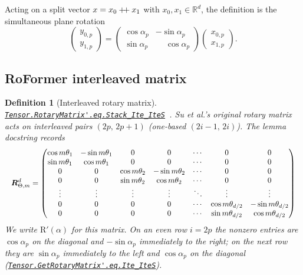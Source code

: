 \documentclass[11pt,a4paper]{article}
\newcommand{\lmod}[1]{\href{http://www.lemma.cn/lean/?module=#1}{\nolinkurl{#1}}}
\newtheorem{definition}[theorem]{Definition}
\newcommand{\R}{\mathbb{R}}
\newcommand{\rot}{\mathrm{R}}
\newcommand{\concat}{\mathbin{+\mkern-4mu+}}
\begin{document}
Acting on a split vector \(x=x_0\concat x_1\) with \(x_0,x_1\in\R^d\), the definition is the simultaneous plane rotation
\begin{equation}
  \label{eq:plane}
  \begin{pmatrix} y_{0,p} \\ y_{1,p} \end{pmatrix}
  =
  \begin{pmatrix}
    \cos\alpha_p & -\sin\alpha_p \\
    \sin\alpha_p & \phantom{-}\cos\alpha_p
  \end{pmatrix}
  \begin{pmatrix} x_{0,p} \\ x_{1,p} \end{pmatrix}.
\end{equation}

\subsection{RoFormer interleaved matrix}
\label{sec:def-su}

\begin{definition}[Interleaved rotary matrix]
\label{def:rotp}
\lmod{Tensor.RotaryMatrix'.eq.Stack_Ite_IteS}~\cite{lemma_rope_su_def}.
Su et al.'s original rotary matrix~\cite{su2021roformer} acts on interleaved pairs \((2p,\,2p+1)\) (one-based \((2i-1,\,2i)\)).
The lemma docstring records
\begin{equation}
\label{eq:rot-su}
\resizebox{\linewidth}{!}{\(\displaystyle
{\boldsymbol{R}}^{d}_{\Theta,m}=\begin{pmatrix}
\cos m\theta_{1} & -\sin m\theta_{1} & 0 & 0 & \cdots & 0 & 0 \\
\sin m\theta_{1} & \cos m\theta_{1} & 0 & 0 & \cdots & 0 & 0 \\
0 & 0 & \cos m\theta_{2} & -\sin m\theta_{2} & \cdots & 0 & 0 \\
0 & 0 & \sin m\theta_{2} & \cos m\theta_{2} & \cdots & 0 & 0 \\
\vdots & \vdots & \vdots & \vdots & \ddots & \vdots & \vdots \\
0 & 0 & 0 & 0 & \cdots & \cos m\theta_{d/2} & -\sin m\theta_{d/2} \\
0 & 0 & 0 & 0 & \cdots & \sin m\theta_{d/2} & \cos m\theta_{d/2}
\end{pmatrix}
\)}
\end{equation}
We write \(\rot'(\alpha)\) for this matrix.
On an even row \(i=2p\) the nonzero entries are \(\cos\alpha_p\) on the diagonal and \(-\sin\alpha_p\) immediately to the right; on the next row they are \(\sin\alpha_p\) immediately to the left and \(\cos\alpha_p\) on the diagonal
(\lmod{Tensor.GetRotaryMatrix'.eq.Ite_IteS}).
\end{definition}
\end{document}
